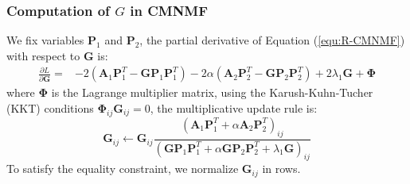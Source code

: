 \documentclass{bmcart}
\begin{document}
\subsubsection*{\textbf{Computation of $G$ in CMNMF}}
We fix variables $\bm{P}_1$ and $\bm{P}_2$,
the partial derivative of Equation (\ref{equ:R-CMNMF}) with respect to $\bm{G}$ is:
\begin{equation}\label{equ:G_gradient}\nonumber
\begin{split}
\frac{\partial{L}}{\partial{\bm{G}}}=
&-2(\bm{A}_1{\bm{P}_1^T} - \bm{G}{\bm{P}_1}{\bm{P}_1^T})-2\alpha(\bm{A}_2{\bm{P}_2^T} - \bm{G}{\bm{P}_2}{\bm{P}_2^T})+2\lambda_1\bm{G}+\bm{\Phi}
\end{split}
\end{equation}
where $\bm{\Phi}$ is the Lagrange multiplier matrix, using the Karush-Kuhn-Tucher (KKT) conditions $\bm{\Phi}_{ij}\bm{G}_{ij}=0$, the multiplicative update rule is:
\begin{equation}\label{equ:updating_G}\nonumber
\bm{G}_{ij}\leftarrow \bm{G}_{ij}
\frac{(\bm{A}_1\bm{P}_1^T+\alpha \bm{A}_2\bm{P}_2^T)_{ij}}
{(\bm{GP}_1\bm{P}_1^T+\alpha \bm{GP}_2\bm{P}_2^T+\lambda_1\bm{G})_{ij}}
\end{equation}
To satisfy the equality constraint, we normalize $\bm{G}_{ij}$ in rows.

\end{document}
